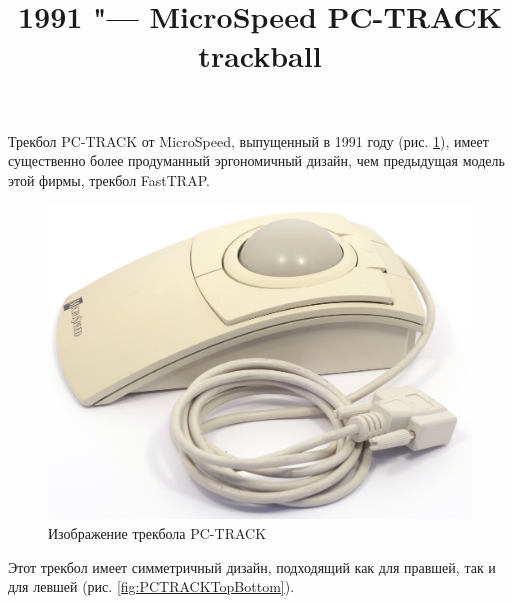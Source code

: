 \documentclass[11pt, a4paper]{article}
\begin{document}
\title{1991 "--- MicroSpeed PC-TRACK trackball}
\date{}
\maketitle
{}
Трекбол PC-TRACK от MicroSpeed, выпущенный в 1991 году (рис. \ref{fig:PCTRACKPic}), имеет существенно более продуманный эргономичный дизайн, чем предыдущая модель этой фирмы, трекбол FastTRAP.

\begin{figure}[h]
    \centering
    \includegraphics[scale=0.4]{1991_microspeed_pc-track/pic_30.jpg}
    \caption{Изображение трекбола PC-TRACK}
    \label{fig:PCTRACKPic}
\end{figure}

Этот трекбол имеет симметричный дизайн, подходящий как для правшей, так и для левшей (рис. \ref{fig:PCTRACKTopBottom}). 
\end{document}
